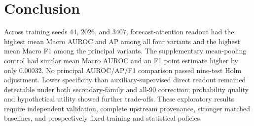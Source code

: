 \section{Conclusion}
Across training seeds 44, 2026, and 3407, forecast-attention readout had the highest mean Macro AUROC and AP among all four variants and the highest mean Macro F1 among the principal variants. The supplementary mean-pooling control had similar mean Macro AUROC and an F1 point estimate higher by only 0.00032. No principal AUROC/AP/F1 comparison passed nine-test Holm adjustment. Lower specificity than auxiliary-supervised direct readout remained detectable under both secondary-family and all-90 correction; probability quality and hypothetical utility showed further trade-offs. These exploratory results require independent validation, complete upstream provenance, stronger matched baselines, and prospectively fixed training and statistical policies.
